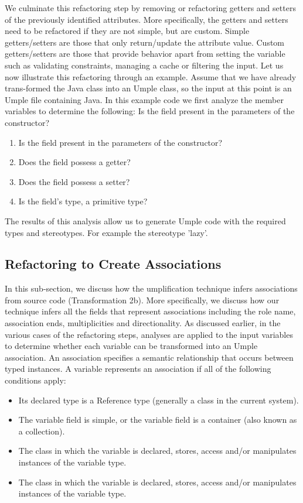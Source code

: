 We culminate this refactoring step by removing or refactoring getters and setters of the previously identified attributes. More specifically, the getters and setters need to be refactored if they are not simple, but are custom. Simple getters/setters are those that only return/update the attribute value.  Custom getters/setters are those that provide behavior apart from setting the variable such as validating constraints, managing a cache or filtering the input.
Let us now illustrate this refactoring through an example. Assume that we have already trans-formed the Java class into an Umple class, so the input at this point is an Umple file containing Java. 
In this example code we first analyze the member variables to determine the following: 
Is the field present in the parameters of the constructor?
\begin{enumerate}
\item Is the field present in the parameters of the constructor?
\item Does the field possess a getter?
\item Does the field possess a setter?
\item Is the field's type, a primitive type?
\end{enumerate}
The results of this analysis allow us to generate Umple code with the required types and stereotypes. For example the stereotype 'lazy'.

\subsection{Refactoring to Create Associations}
In this sub-section, we discuss how the umplification technique infers associations from source code (Transformation 2b). More specifically, we discuss how our technique infers all the fields that represent associations including the role name, association ends, multiplicities and directionality.
As discussed earlier, in the various cases of the refactoring steps, analyses are applied to the input variables to determine whether each variable can be transformed into an Umple association. An association specifies a semantic relationship that occurs between typed instances. A variable represents an association if all of the following conditions apply:
\begin{itemize}
\item Its declared type is a Reference type (generally a class in the current system).
\item The variable field is simple, or the variable field is a container (also known as a collection).
\item The class in which the variable is declared, stores, access and/or manipulates instances of the variable type.
\item The class in which the variable is declared, stores, access and/or manipulates instances of the variable type.
\end{itemize}

